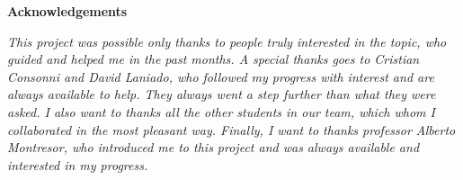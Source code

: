 \thispagestyle{empty}

\begin{center}
  {\bf \Huge Acknowledgements}
\end{center}

\vspace{4cm}


\emph{
  This project was possible only thanks to people truly interested in the topic, who guided and helped me in the past months. A special thanks goes to Cristian Consonni and David Laniado, who followed my progress with interest and are always available to help. They always went a step further than what they were asked. I also want to thanks all the other students in our team, which whom I collaborated in the most pleasant way. Finally, I want to thanks professor Alberto Montresor, who introduced me to this project and was always available and interested in my progress. 
}

